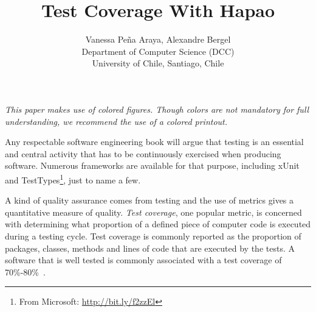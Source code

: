 \documentclass{sig-alternate}
\newcommand{\Title}{Test Coverage With Hapao}
\newcommand{\TitleShort}{\Title}
\newcommand{\Authors}{Vanessa Pe\~na Araya, Alexandre Bergel}
\newcommand{\AuthorsShort}{V. Pe\~na, A. Bergel}
\newcommand{\seclabel}[1]{\label{sec:#1}}
\begin{document}
\title{\Title}

\author{\Authors\\[3mm]
Department of Computer Science (DCC)\\ University of Chile, Santiago, Chile\\[1 ex]
} 

\maketitle

\emph{This paper makes use of colored figures. Though colors are not mandatory for full understanding, we recommend  the use of a colored printout.\\}



Any respectable software engineering book will argue that testing is an essential and central activity that has to be continuously exercised when producing software. Numerous frameworks are available for that purpose, including xUnit and TestTypes\footnote{From Microsoft: \url{http://bit.ly/f2zzEl}}, just to name a few.

%




A kind of quality assurance comes from testing and the use of metrics gives a quantitative measure of quality. \emph{Test coverage}, one popular  metric, is concerned with determining what proportion of a defined piece of computer code is  executed during a testing cycle. 
Test coverage is commonly reported as the proportion of packages, classes, methods and lines of code that are executed by the tests. 
A software that is well tested is commonly associated with a test coverage of 70\%-80\%~\cite{Mock09a}. %
\end{document}
